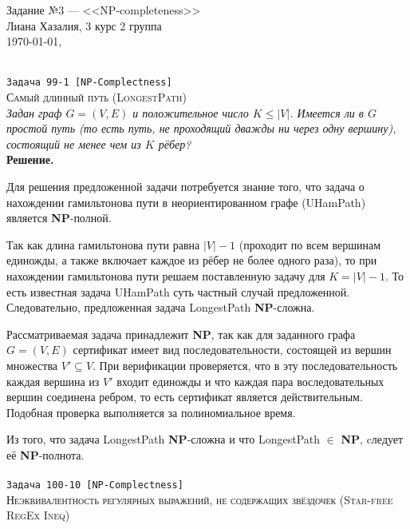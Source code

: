 \documentclass[10pt]{article}
\begin{document}
\def\chap#1#2{\ \\ {\large\bf#1 \ | \ \tt\scshape#2} \par}

{\bf
\begin{flushright}
\small{Задание №3 --- <<NP-completeness>> \\ Лиана Хазалия, 3 курс 2 группа\\  \today, \currenttime}
\end{flushright}}
\rm
\hline
\ \\[0.5 cm]
{\large\texttt{Задача 99-1 [NP-Complectness]}}
\\
\textsc{Самый длинный путь (LongestPath)}
\ \\[0.1cm]
\textit{Задан граф $G=(V,E)$ и положительное число $K\leq |V|$. Имеется ли в $G$ простой путь (то есть путь, не проходящий дважды ни через одну вершину), состоящий не менее чем из $K$ рёбер?}
\ \\[0.3cm]
\textbf{Решение.}  
\medskip\par Для решения предложенной задачи потребуется знание того, что задача о нахождении гамильтонова пути в неориентированном графе (UHamPath) является \textbf{NP}-полной.
\medskip\par Так как длина гамильтонова пути равна $|V|-1$ (проходит по всем вершинам единожды, а также включает каждое из рёбер не более одного раза), то при нахождении гамильтонова пути решаем поставленную задачу для $K=|V|-1$. То есть известная задача UHamPath суть частный случай предложенной. Следовательно, предложенная задача LongestPath \textbf{NP}-сложна.
\medskip\par Рассматриваемая задача принадлежит \textbf{NP}, так как для заданного графа $G=(V, E)$ сертификат имеет вид последовательности, состоящей из вершин множества $V'\subseteq V$. При верификации проверяется, что в эту последовательность каждая вершина из $V'$ входит единожды и что каждая пара воследовательных вершин соединена ребром, то есть сертификат является действительным. Подобная проверка выполняется за полиномиальное время. 
\medskip\par Из того, что задача LongestPath \textbf{NP}-сложна и что LongestPath $\in$ \textbf{NP}, cледует её \textbf{NP}-полнота.
\ \\[0.5 cm]
\hline
\ \\[0.5 cm]
{\large\texttt{Задача 100-10 [NP-Complectness]}}
\\
\textsc{Неэквивалентность регулярных выражений, не содержащих звёздочек (Star-free RegEx Ineq)}
\ \\[0.1cm]
\end{document}
